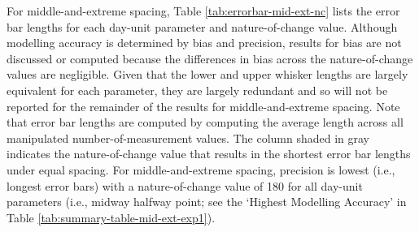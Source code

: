 \documentclass[
12pt, %
twoside,
english]{guelphthesis}
\theoremstyle{definition}
\theoremstyle{definition}
\theoremstyle{definition}
\theoremstyle{definition}
\theoremstyle{remark}
\begin{document}
For middle-and-extreme spacing, Table \ref{tab:errorbar-mid-ext-nc} lists the error bar lengths for each day-unit parameter and nature-of-change value. Although modelling accuracy is determined by bias and precision, results for bias are not discussed or computed because the differences in bias across the nature-of-change values are negligible. Given that the lower and upper whisker lengths are largely equivalent for each parameter, they are largely redundant and so will not be reported for the remainder of the results for middle-and-extreme spacing. Note that error bar lengths are computed by computing the average length across all manipulated number-of-measurement values. The column shaded in gray indicates the nature-of-change value that results in the shortest error bar lengths under equal spacing. For middle-and-extreme spacing, precision is lowest (i.e., longest error bars) with a nature-of-change value of 180 for all day-unit parameters (i.e., midway halfway point; see the `Highest Modelling Accuracy' in Table \ref{tab:summary-table-mid-ext-exp1}).
\end{document}
